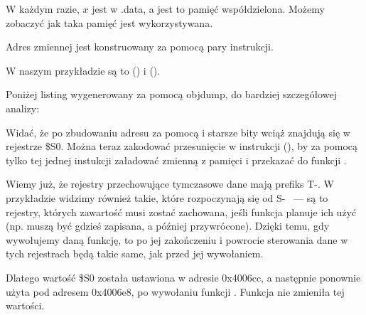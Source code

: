 W każdym razie, $x$ jest w .data, a jest to pamięć współdzielona. Możemy zobaczyć jak taka pamięć jest wykorzystywana.


Adres zmiennej jest konstruowany za pomocą pary instrukcji.

W naszym przykładzie są to  () i  ().

Poniżej listing wygenerowany za pomocą objdump, do bardziej szczegółowej analizy:




Widać, że po zbudowaniu adresu za pomocą  i  starsze bity wciąż znajdują się w
rejestrze \$S0. Można teraz zakodować przesunięcie w instrukcji  (),
by za pomocą tylko tej jednej instukcji załadować zmienną z pamięci i przekazać do funkcji \printf.

Wiemy już, że rejestry przechowujące tymczasowe dane mają prefiks T-. W przykładzie widzimy również takie, które rozpoczynają się od S- ~---
są to rejestry, których zawartość musi zostać zachowana, jeśli funkcja planuje ich użyć (np. muszą być gdzieś zapisana, a później przywrócone).
Dzięki temu, gdy wywołujemy daną funkcję, to po jej zakończeniu i powrocie sterowania dane w tych rejestrach będą takie same, jak przed jej wywołaniem.

Dlatego wartość \$S0 została ustawiona w adresie 0x4006cc, a następnie ponownie użyta pod adresem 0x4006e8, po wywołaniu funkcji \scanf.
Funkcja \scanf nie zmieniła tej wartości.

